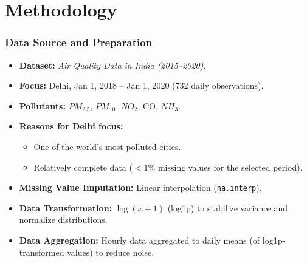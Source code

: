 \documentclass[svgnames, 12pt]{beamer}
\begin{document}
\section{Methodology}
\begin{frame}
    \frametitle{Data Source and Preparation}
    \begin{itemize}
        \item \textbf{Dataset:} \textit{Air Quality Data in India (2015--2020)}.
        \item \textbf{Focus:} Delhi, Jan 1, 2018 -- Jan 1, 2020 (732 daily observations).
        \item \textbf{Pollutants:} $PM_{2.5}$, $PM_{10}$, $NO_2$, CO, $NH_3$.
        \item \textbf{Reasons for Delhi focus:}
            \begin{itemize}
                \item One of the world's most polluted cities.
                \item Relatively complete data ($<1\%$ missing values for the selected period).
            \end{itemize}
        \item \textbf{Missing Value Imputation:} Linear interpolation (\texttt{na.interp}).
        \item \textbf{Data Transformation:} $\log(x+1)$ (log1p) to stabilize variance and normalize distributions.
        \item \textbf{Data Aggregation:} Hourly data aggregated to daily means (of log1p-transformed values) to reduce noise.
    \end{itemize}
\end{frame}
\end{document}
